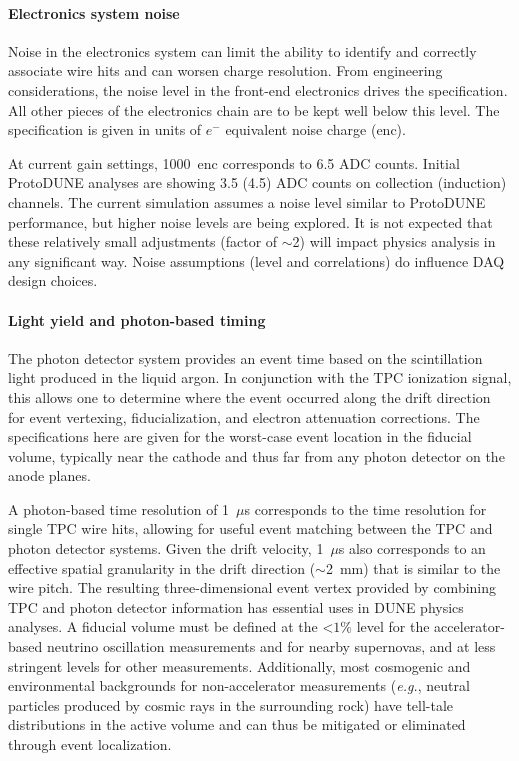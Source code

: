 \paragraph{Electronics system noise}
Noise in the electronics system can 
limit the ability to identify and correctly associate wire hits 
and can worsen charge resolution.  From engineering
considerations, the noise level in the front-end electronics 
drives the specification.  All other pieces of the electronics 
chain are to be kept well below this level.  
The specification is given in units of $e^-$ equivalent 
noise charge (enc).

At current gain settings, 1000~enc corresponds 
to 6.5 ADC counts.  Initial ProtoDUNE analyses are 
showing 3.5 (4.5) ADC counts on collection (induction) channels. 
The current  simulation assumes a noise level similar to 
ProtoDUNE performance, but higher noise levels are being 
explored.  It is not expected that these relatively small
adjustments (factor of $\sim$2) will impact physics analysis 
in any significant way.  Noise assumptions (level and 
correlations) do influence DAQ design choices.

\paragraph{Light yield and photon-based timing}
The photon detector system provides an event time 
based on the scintillation light produced in the liquid argon.  
In conjunction with the TPC ionization signal, this allows 
one to determine where the event occurred along 
the drift direction for event vertexing, fiducialization, 
and electron attenuation corrections.  The 
specifications here are given for the worst-case event 
location in the fiducial volume, typically near the cathode 
and thus far from any photon detector on the anode planes.

A photon-based time resolution of 1~$\mu$s corresponds to the 
time resolution for single TPC wire hits, allowing for useful 
event matching between the TPC and photon detector systems.  
Given the drift velocity, 1~$\mu$s also corresponds to an 
effective spatial granularity in the drift direction 
($\sim$2~mm) that is similar to the wire pitch.  The resulting 
three-dimensional event vertex provided by combining TPC and 
photon detector information has essential uses in DUNE physics 
analyses.  A fiducial volume must be defined at the 
$\mathord{<}1\%$ level for the accelerator-based neutrino 
oscillation measurements and for nearby supernovas, and at less 
stringent levels for other measurements.  Additionally, most 
cosmogenic and environmental backgrounds for non-accelerator 
measurements ({\em e.g.}, neutral particles produced by cosmic 
rays in the surrounding rock) have tell-tale distributions in the
active volume and can thus be mitigated or eliminated through 
event localization.

